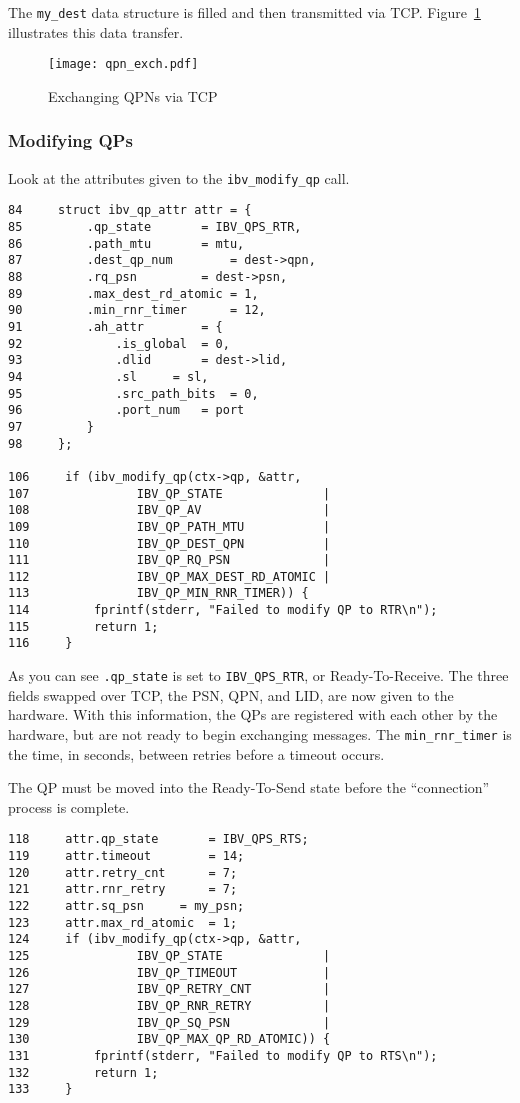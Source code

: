 \documentclass[letterpaper,12pt]{article}
\begin{document}
The {\tt my\_dest} data structure is filled and then transmitted via TCP.
Figure~\ref{fig:TCP} illustrates this data transfer.


\begin{figure}
 \centering
 \texttt{[image: qpn\_exch.pdf]}
\caption{Exchanging QPNs via TCP}
 \label{fig:TCP}
\end{figure}

\subsubsection{Modifying QPs}
Look at the attributes given to the {\tt ibv\_modify\_qp} call.

\lstset{language=C, caption=Moving QP to Ready to Recv}
\begin{lstlisting}
84     struct ibv_qp_attr attr = {
85         .qp_state       = IBV_QPS_RTR,
86         .path_mtu       = mtu,
87         .dest_qp_num        = dest->qpn,
88         .rq_psn         = dest->psn,
89         .max_dest_rd_atomic = 1,
90         .min_rnr_timer      = 12,
91         .ah_attr        = {
92             .is_global  = 0,
93             .dlid       = dest->lid,
94             .sl     = sl,
95             .src_path_bits  = 0,
96             .port_num   = port
97         }
98     };

106     if (ibv_modify_qp(ctx->qp, &attr,
107               IBV_QP_STATE              |
108               IBV_QP_AV                 |
109               IBV_QP_PATH_MTU           |
110               IBV_QP_DEST_QPN           |
111               IBV_QP_RQ_PSN             |
112               IBV_QP_MAX_DEST_RD_ATOMIC |
113               IBV_QP_MIN_RNR_TIMER)) {
114         fprintf(stderr, "Failed to modify QP to RTR\n");
115         return 1;
116     }
\end{lstlisting}

As you can see {\tt .qp\_state} is set to {\tt IBV\_QPS\_RTR}, or
Ready-To-Receive. The three fields swapped over TCP, the PSN, QPN, and
LID, are now given to the hardware. With this information, the QPs are
registered with each other by the hardware, but are not ready to begin
exchanging messages. The {\tt min\_rnr\_timer} is the time, in seconds,
between retries before a timeout occurs.

The QP must be moved into the Ready-To-Send state before the ``connection'' process is complete.

\lstset{language=C, caption=Moving QP to Ready to Send}
\begin{lstlisting}
118     attr.qp_state       = IBV_QPS_RTS;
119     attr.timeout        = 14;
120     attr.retry_cnt      = 7;
121     attr.rnr_retry      = 7;
122     attr.sq_psn     = my_psn;
123     attr.max_rd_atomic  = 1;
124     if (ibv_modify_qp(ctx->qp, &attr,
125               IBV_QP_STATE              |
126               IBV_QP_TIMEOUT            |
127               IBV_QP_RETRY_CNT          |
128               IBV_QP_RNR_RETRY          |
129               IBV_QP_SQ_PSN             |
130               IBV_QP_MAX_QP_RD_ATOMIC)) {
131         fprintf(stderr, "Failed to modify QP to RTS\n");
132         return 1;
133     }
\end{lstlisting}
\end{document}

